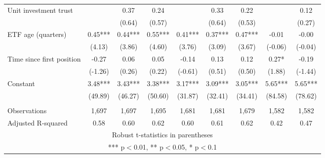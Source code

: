 \documentclass[]{article}
\begin{document}
\begin{tabular}{lcccccccc}
Unit investment trust &  & 0.37 & 0.24 &  & 0.33 & 0.22 &  & 0.12 \\
 &  & (0.64) & (0.57) &  & (0.64) & (0.53) &  & (0.27) \\
ETF age (quarters) & 0.45*** & 0.44*** & 0.55*** & 0.41*** & 0.37*** & 0.47*** & -0.01 & -0.00 \\
 & (4.13) & (3.86) & (4.60) & (3.76) & (3.09) & (3.67) & (-0.06) & (-0.04) \\
Time since first position & -0.27 & 0.06 & 0.05 & -0.14 & 0.13 & 0.12 & 0.27* & -0.19 \\
 & (-1.26) & (0.26) & (0.22) & (-0.61) & (0.51) & (0.50) & (1.88) & (-1.44) \\
Constant & 3.48*** & 3.43*** & 3.38*** & 3.17*** & 3.09*** & 3.05*** & 5.65*** & 5.65*** \\
 & (49.89) & (46.27) & (50.60) & (31.87) & (32.41) & (34.41) & (84.58) & (78.62) \\
 &  &  &  &  &  &  &  &  \\
Observations & 1,697 & 1,697 & 1,695 & 1,681 & 1,681 & 1,679 & 1,582 & 1,582 \\
 Adjusted R-squared & 0.58 & 0.60 & 0.62 & 0.60 & 0.61 & 0.62 & 0.42 & 0.47 \\ \hline
\multicolumn{9}{c}{ Robust t-statistics in parentheses} \\
\multicolumn{9}{c}{ *** p$<$0.01, ** p$<$0.05, * p$<$0.1} \\
\end{tabular}
\end{document}
